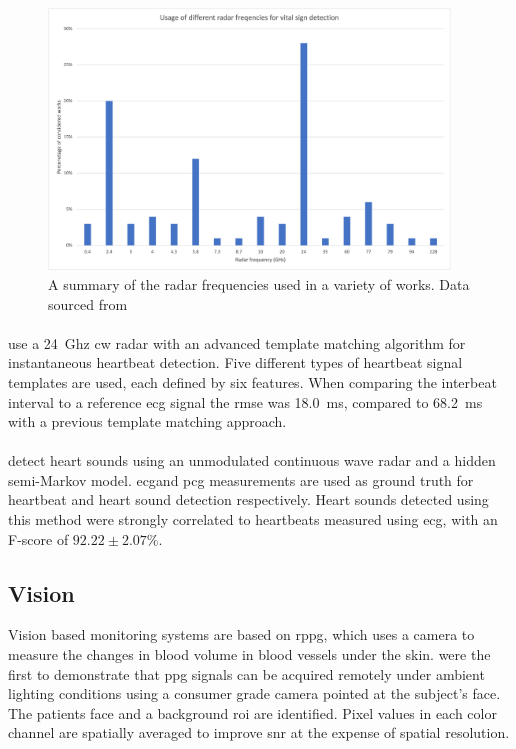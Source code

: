 \documentclass[11pt, parskip=half*,twoside=false]{scrbook}
\begin{document}
\begin{figure} 
	\centering
	\includegraphics[width=0.95\textwidth]{radar_frequencies} 
	\caption{A summary of the radar frequencies used in a variety of works. Data sourced from \citet{singhMultiResidentNonContactVital2021}}
	\label{fig:radar_freqs}
\end{figure}

\paragraph{\citet{willAdvancedTemplateMatching2017}} use a 24~Ghz \gls{cw} radar with an advanced template matching algorithm for instantaneous heartbeat detection. Five different types of heartbeat signal templates are used, each defined by six features. When comparing the interbeat interval to a reference \gls{ecg} signal the \gls{rmse} was 18.0~ms, compared to 68.2~ms with a previous template matching approach.

\paragraph{\citet{willRadarBasedHeartSound2018}} detect heart sounds using an unmodulated continuous wave radar and a hidden semi-Markov model. \gls{ecg}and \gls{pcg} measurements are used as ground truth for heartbeat and heart sound detection respectively. Heart sounds detected using this method were strongly correlated to heartbeats measured using \gls{ecg}, with an F-score of $92.22\pm 2.07 \%$.

\subsection{Vision}
Vision based monitoring systems are based on \gls{rppg}, which uses a camera to measure the changes in blood volume in blood vessels under the skin. \citet{verkruysseRemotePlethysmographicImaging2008} were the first to demonstrate that \gls{ppg} signals can be acquired remotely under ambient lighting conditions using a consumer grade camera pointed at the subject's face. The patients face and a background \gls{roi} are identified. Pixel values in each color channel are spatially averaged to improve \gls{snr} at the expense of spatial resolution. 
\end{document}
